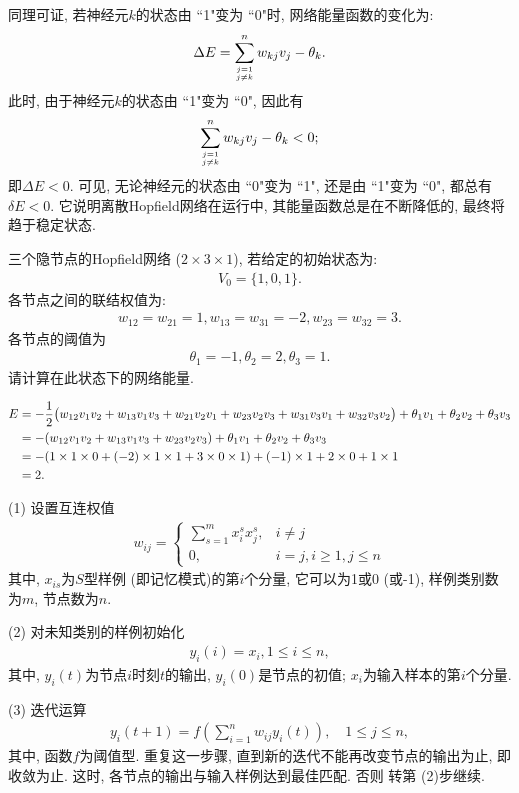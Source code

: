 同理可证, 若神经元$k$的状态由 ``1"变为 ``0"时, 网络能量函数的变化为:
\begin{align}
    \Delta E=\sum_{j=1 \atop j \neq k}^{n} w_{k j} v_{j}-\theta_{k}.
\end{align}
此时, 由于神经元$k$的状态由 ``1"变为 ``0", 因此有
\begin{align}
    \sum_{j=1 \atop j \neq k}^{n} w_{k j} v_{j}-\theta_{k}<0;
\end{align}
即$\Delta E<0$.
可见, 无论神经元的状态由 ``0"变为 ``1", 还是由 ``1"变为 ``0", 都总有$\delta E<0$. 它说明离散Hopfield网络在运行中, 其能量函数总是在不断降低的, 最终将趋于稳定状态.
\begin{example}
三个隐节点的Hopfield网络 ($2\times 3\times 1$), 若给定的初始状态为:
\begin{align*}
    V_0=\{1,0,1\}.
\end{align*}
各节点之间的联结权值为:
\begin{align*}
     w_{12}=w_{21}=1, w_{13}=w_{31}=-2, w_{23}=w_{32}=3.
\end{align*}
各节点的阈值为
\begin{align*}
    \theta_1=-1, \theta_2=2, \theta_3=1.
\end{align*}
请计算在此状态下的网络能量.
\end{example}
\begin{result}
\begin{align}
E   &=-\frac 1 2 \big (w_{12}v_1v_2+w_{13}v_1v_3+w_{21}v_2 v_1+w_{23}v_2v_3+w_{31}v_3v_1+w_{32}v_3 v_2\big)+ \theta_1 v_1+ \theta_2v_2+ \theta_3v_3\notag\\
    &= - (w_{12}v_1v_2+w_{13}v_1v_3+w_{23}v_2v_3)+ \theta_1v_1+\theta_2v_2+\theta_3v_3\notag\\
    &=- (1\times 1\times 0+ (-2)\times 1\times 1+3\times 0\times 1)+ (-1) \times 1+2\times 0+1\times 1\notag\\
    &=2.
\end{align}

 (1) 设置互连权值
\begin{align}
    w_{i j}=\left\{\begin{array}{ll}{\sum_{s=1}^{m} x_{i}^{s} x_{j}^{s},} & {i \neq j} \\ {0,} & {i=j, i \geq 1, j \leq n}\end{array}\right.
\end{align}
其中, $x_{is}$为$S$型样例 (即记忆模式)的第$i$个分量, 它可以为1或0 (或-1), 样例类别数为$m$, 节点数为$n$.

 (2) 对未知类别的样例初始化
\begin{align}
    y_{i} (i)=x_{i}, 1 \leq i \leq n,
\end{align}
其中, $y_i (t)$为节点$i$时刻$t$的输出, $y_i (0)$是节点的初值; $x_i$为输入样本的第$i$个分量.

 (3) 迭代运算
\begin{align}
    y_{i} (t+1)=f\left (\sum_{i=1}^{n} w_{i j} y_{i} (t)\right), \quad 1 \leq j \leq n,
\end{align}
其中, 函数$f$为阈值型. 重复这一步骤, 直到新的迭代不能再改变节点的输出为止, 即收敛为止.
这时, 各节点的输出与输入样例达到最佳匹配. 否则 转第 (2)步继续.
\end{result}
